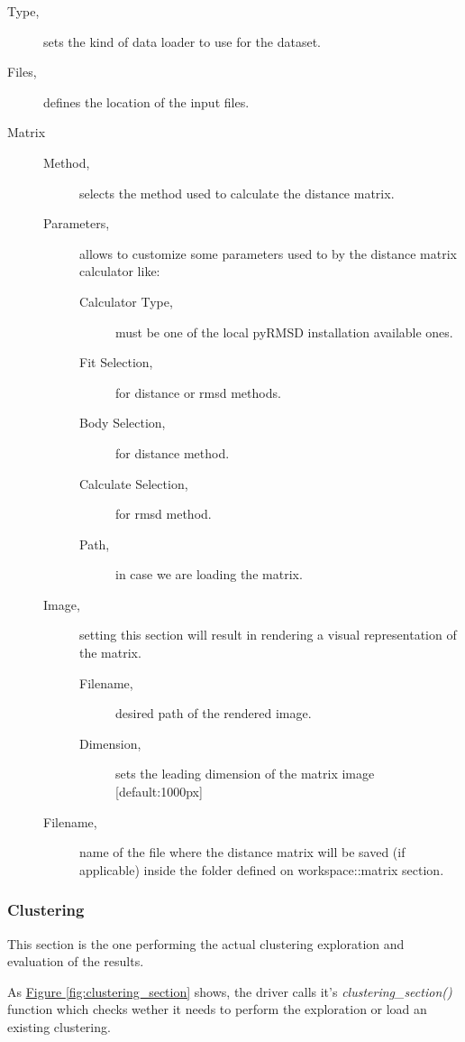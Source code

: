 \begin{description}
\item [Type, ] sets the kind of data loader to use for the dataset.
\item [Files,] defines the location of the input files.
\item [Matrix] \hfil
\begin{description}
\item [Method,] selects the method used to calculate the distance matrix.
\item [Parameters,] allows to customize some parameters used to by the distance matrix calculator like:
\begin{description}
\item [Calculator Type,] must be one of the local pyRMSD installation available ones.
\item [Fit Selection,] for distance or rmsd methods.
\item [Body Selection,] for distance method.
\item [Calculate Selection,] for rmsd method.
\item [Path,] in case we are loading the matrix.
\end{description}
\item [Image,] setting this section will result in rendering a visual representation of the matrix.
\begin{description}
\item [Filename,] desired path of the rendered image.
\item [Dimension,] sets the leading dimension of the matrix image [default:1000px]
\end{description}
\item [Filename,] name of the file where the distance matrix will be saved (if applicable) inside the folder defined on workspace::matrix section. 
\end{description}
\end{description}


\subsubsection{Clustering}

This section is the one performing the actual clustering exploration and evaluation of the results. 

As \hyperref[fig:clustering_section]{Figure \ref{fig:clustering_section}} shows, the driver calls it's \textit{clustering\_section()} function which checks wether it needs to perform the exploration or load an existing clustering. 

